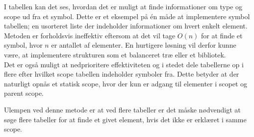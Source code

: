 \noindent I tabellen kan det ses, hvordan det er muligt at finde informationer om type og scope ud fra et symbol. Dette er et eksempel på én måde at implementere symbol tabellen; en usorteret liste der indeholder informationer om hvert enkelt element. Metoden er forholdsvis ineffektiv eftersom at det vil tage $O(n)$ for at finde et symbol, hvor $n$ er antallet af elementer. En hurtigere løsning vil derfor kunne være, at implementere strukturen som et balanceret træ eller et bibliotek.\\

\noindent Det er også muligt at nedprioritere effektiviteten og i stedet dele tabellerne op i flere efter hvilket scope tabellen indeholder symboler fra. Dette betyder at der naturligt opnås et statisk scope, hvor der kun er adgang til elementer i scopet og parent scope.

    
    
\noindent Ulempen ved denne metode er at ved flere tabeller er det måske nødvendigt at søge flere tabeller for at finde et givet element, hvis det ikke er erklæret i samme scope.
    
